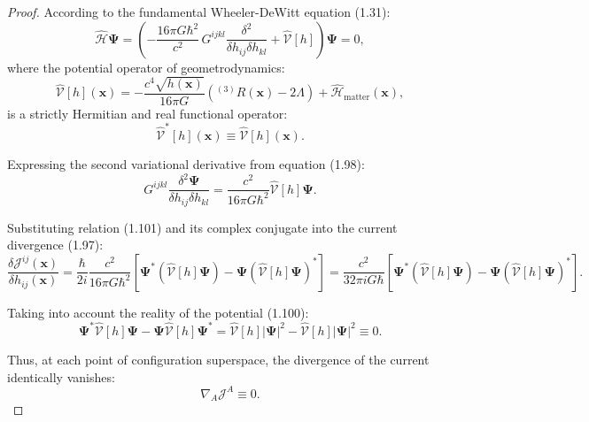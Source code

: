\documentclass[11pt,a4paper]{article}
\theoremstyle{definition}
\begin{document}
\begin{proof}
According to the fundamental Wheeler-DeWitt equation (1.31):
\begin{equation}\label{eq:1.98}\tag{1.98}
\hat{\mathcal{H}} \mathbf{\Psi} = \left( -\frac{16\pi G \hbar^2}{c^2} \, G^{ijkl} \frac{\delta^2}{\delta h_{ij} \delta h_{kl}} + \hat{\mathcal{V}}[h] \right) \mathbf{\Psi} = 0,
\end{equation}
where the potential operator of geometrodynamics:
\begin{equation}\label{eq:1.99}\tag{1.99}
\hat{\mathcal{V}}[h](\mathbf{x}) = -\frac{c^4 \sqrt{h(\mathbf{x})}}{16\pi G} \left( {}^{(3)}R(\mathbf{x}) - 2\Lambda \right) + \hat{\mathcal{H}}_{\text{matter}}(\mathbf{x}),
\end{equation}
is a strictly Hermitian and real functional operator:
\begin{equation}\label{eq:1.100}\tag{1.100}
\hat{\mathcal{V}}^*[h](\mathbf{x}) \equiv \hat{\mathcal{V}}[h](\mathbf{x}).
\end{equation}

Expressing the second variational derivative from equation (1.98):
\begin{equation}\label{eq:1.101}\tag{1.101}
G^{ijkl} \frac{\delta^2 \mathbf{\Psi}}{\delta h_{ij} \delta h_{kl}} = \frac{c^2}{16\pi G \hbar^2} \hat{\mathcal{V}}[h] \mathbf{\Psi}.
\end{equation}

Substituting relation (1.101) and its complex conjugate into the current divergence (1.97):
\begin{equation}\label{eq:1.102}\tag{1.102}
\frac{\delta \mathcal{J}^{ij}(\mathbf{x})}{\delta h_{ij}(\mathbf{x})} = \frac{\hbar}{2i} \frac{c^2}{16\pi G \hbar^2} \left[ \mathbf{\Psi}^* \left( \hat{\mathcal{V}}[h] \mathbf{\Psi} \right) - \mathbf{\Psi} \left( \hat{\mathcal{V}}[h] \mathbf{\Psi} \right)^* \right] = \frac{c^2}{32\pi i G \hbar} \left[ \mathbf{\Psi}^* \left( \hat{\mathcal{V}}[h] \mathbf{\Psi} \right) - \mathbf{\Psi} \left( \hat{\mathcal{V}}[h] \mathbf{\Psi} \right)^* \right].
\end{equation}

Taking into account the reality of the potential (1.100):
\begin{equation}\label{eq:1.103}\tag{1.103}
\mathbf{\Psi}^* \hat{\mathcal{V}}[h] \mathbf{\Psi} - \mathbf{\Psi} \hat{\mathcal{V}}[h] \mathbf{\Psi}^* = \hat{\mathcal{V}}[h] |\mathbf{\Psi}|^2 - \hat{\mathcal{V}}[h] |\mathbf{\Psi}|^2 \equiv 0.
\end{equation}

Thus, at each point of configuration superspace, the divergence of the current identically vanishes:
\begin{equation}\label{eq:1.104}\tag{1.104}
\nabla_A \mathcal{J}^A \equiv 0.
\end{equation}


\end{proof}
\end{document}
